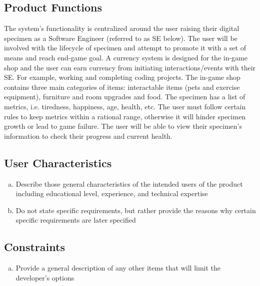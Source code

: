 \documentclass[]{article}
\begin{document}
\subsection{Product Functions}
\label{sub:product_functions}
The system’s functionality is centralized around the user raising their digital 
specimen as a Software Engineer (referred to as SE below). The user will be 
involved with the lifecycle of specimen and attempt to promote it with a set 
of means and reach end-game goal. A currency system is designed for the in-game 
shop and the user can earn currency from initiating interactions/events with 
their SE. For example, working and completing coding projects. The in-game 
shop contains three main categories of items: interactable items (pets and 
exercise equipment), furniture and room upgrades and food. The specimen has a 
list of metrics, i.e. tiredness, happiness, age, health, etc. The user must 
follow certain rules to keep metrics within a rational range, otherwise it will 
hinder specimen growth or lead to game failure. The user will be able to view 
their specimen’s information to check their progress and current health. 

\subsection{User Characteristics}
\label{sub:user_characteristics}
\begin{enumerate}[a)]
	\item Describe those general characteristics of the intended users of the product including educational level, experience, and technical expertise
	\item Do not state specific requirements, but rather provide the reasons why certain specific requirements are later specified
\end{enumerate}

\subsection{Constraints}
\label{sub:constraints}
\begin{enumerate}[a)]
	\item Provide a general description of any other items that will limit the developer's options
\end{enumerate}
\end{document}
